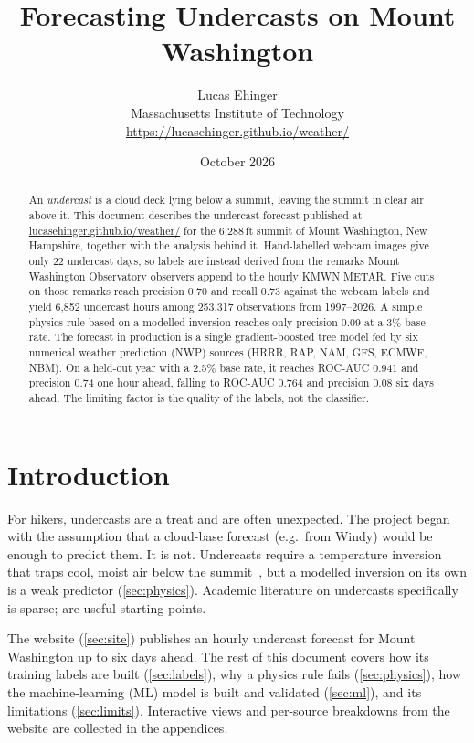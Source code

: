 \documentclass[11pt]{article}
\title{Forecasting Undercasts on Mount Washington}
\author{Lucas Ehinger\\\small Massachusetts Institute of Technology\\\small\url{https://lucasehinger.github.io/weather/}}
\date{October 2026}
\begin{document}
\maketitle

\begin{abstract}
An \emph{undercast} is a cloud deck lying below a summit, leaving the summit in clear air above it.
This document describes the undercast forecast published at \url{lucasehinger.github.io/weather/}
for the 6{,}288\,ft summit of Mount Washington, New Hampshire, together with the analysis behind it.
Hand-labelled webcam images give only 22 undercast days, so labels are instead derived from the
remarks Mount Washington Observatory observers append to the hourly KMWN METAR. Five cuts on those
remarks reach precision 0.70 and recall 0.73 against the webcam labels and yield 6{,}852 undercast
hours among 253{,}317 observations from 1997--2026. A simple physics rule based on a modelled
inversion reaches only precision 0.09 at a 3\% base rate. The forecast in production is a single
gradient-boosted tree model fed by six numerical weather prediction (NWP) sources (HRRR, RAP, NAM,
GFS, ECMWF, NBM). On a held-out year with a 2.5\% base rate, it reaches ROC-AUC 0.941 and precision
0.74 one hour ahead, falling to ROC-AUC 0.764 and precision 0.08 six days ahead. The limiting factor
is the quality of the labels, not the classifier.
\end{abstract}

\tableofcontents

\section{Introduction}
For hikers, undercasts are a treat and are often unexpected. The project began with the assumption
that a cloud-base forecast (e.g.\ from Windy) would be enough to predict them. It is not. Undercasts
require a temperature inversion that traps cool, moist air below the summit~\cite{mwobs,gmc}, but a
modelled inversion on its own is a weak predictor (\cref{sec:physics}). Academic literature on
undercasts specifically is sparse; \cite{sd,blm,esw} are useful starting points.

The website (\cref{sec:site}) publishes an hourly undercast forecast for Mount Washington up to six
days ahead. The rest of this document covers how its training labels are built
(\cref{sec:labels}), why a physics rule fails (\cref{sec:physics}), how the machine-learning (ML)
model is built and validated (\cref{sec:ml}), and its limitations (\cref{sec:limits}).
Interactive views and per-source breakdowns from the website are collected in the appendices.
\end{document}
